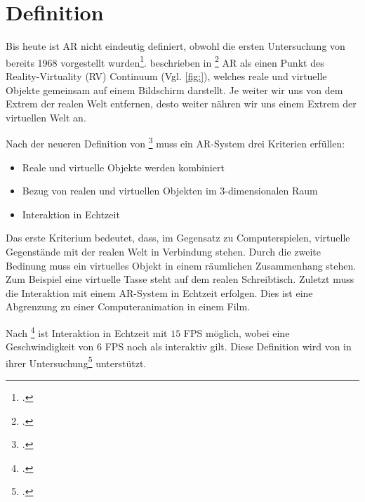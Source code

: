 \section{Definition} %
\label{sec:definition}
\begin{comment}
	Definiere Begriffe der Augmented Reality und Bildverarbeitung, die dem Leser nicht geläufig sind. Denke dabei an Prof. Klocke als Leser ohne besonderen Kenntnisstand in der AR/Bildverarbeitung.

	Azuma Definition der AR
	Milgram + Kishino MR oder nur Milgram Definition MR
\end{comment}

Bis heute ist \gls{AR} nicht eindeutig definiert, obwohl die ersten Untersuchung von \citeauthor{sutherland} bereits
 1968 vorgestellt wurden\footcite{sutherland}. \citeauthor{milgram94b} beschrieben in
 \footcite{milgram94b} \gls{AR} als einen Punkt des Reality-Virtuality (RV) Continuum
 (Vgl. \autoref{fig:}), welches reale und virtuelle Objekte gemeinsam auf einem Bildschirm darstellt. Je weiter wir uns
 von dem Extrem der realen Welt entfernen, desto weiter nähren wir uns einem Extrem der virtuellen Welt an.

Nach der neueren Definition von \citeauthor{azuma97}\footcite{azuma97} muss ein \gls{AR}-System drei Kriterien
 erfüllen:
\begin{itemize}
	\item Reale und virtuelle Objekte werden kombiniert
	\item Bezug von realen und virtuellen Objekten im 3-dimensionalen Raum
	\item Interaktion in Echtzeit
\end{itemize}
Das erste Kriterium bedeutet, dass, im Gegensatz zu Computerspielen, virtuelle Gegenstände mit der realen Welt in
 Verbindung stehen. Durch die zweite Bedinung muss ein virtuelles Objekt in einem räumlichen Zusammenhang stehen. Zum
 Beispiel eine virtuelle Tasse steht auf dem realen Schreibtisch. Zuletzt muss die Interaktion mit einem
 \gls{AR}-System in Echtzeit erfolgen. Dies ist eine Abgrenzung zu einer Computeranimation in einem Film.

Nach \citeauthor{moeller2008}\footcite[Vgl.][S.~1]{moeller2008} ist Interaktion in Echtzeit mit $15$ FPS möglich, wobei
 eine Geschwindigkeit von $6$ FPS noch als interaktiv gilt. Diese Definition wird von \citeauthor{wagner09b} in ihrer
 Untersuchung\footcite[Vgl.][S.~8--9]{wagner09b} unterstützt.

